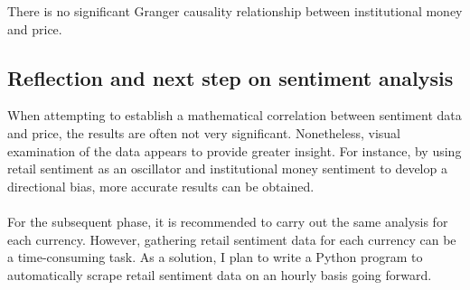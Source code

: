 \documentclass{article}
\begin{document}
There is no significant Granger causality relationship between institutional money and price.


\subsection{Reflection and next step on sentiment analysis}
When attempting to establish a mathematical correlation between sentiment data and price, the results are often not very significant. Nonetheless, visual examination of the data appears to provide greater insight. For instance, by using retail sentiment as an oscillator and institutional money sentiment to develop a directional bias, more accurate results can be obtained.\\ \\ 
For the subsequent phase, it is recommended to carry out the same analysis for each currency. However, gathering retail sentiment data for each currency can be a time-consuming task. As a solution, I plan to write a Python program to automatically scrape retail sentiment data on an hourly basis going forward.
\end{document}
